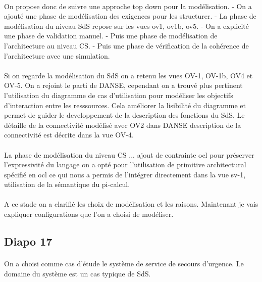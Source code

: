 \paragraph{} 
On propose donc de suivre une approche top down pour la modélisation.
- On a ajouté une phase de modélisation des exigences pour les
structurer. 
- La phase de modélisation du niveau SdS repose sur les vues ov1, ov1b,
ov5.
- On a explicité une phase de validation manuel. 
- Puis une phase de modélisation de l'architecture au niveau CS.
- Puis une phase de vérification de la cohérence de l'architecture
avec une simulation. 

\paragraph{}
Si on regarde la modélisation du SdS on a retenu les vues OV-1, OV-1b,
OV4 et OV-5. 
%
On a rejoint le parti de DANSE, cependant on a trouvé plus
pertinent l'utilisation du diagramme de cas d'utilisation pour
modéliser les objectifs d'interaction entre les resssources. Cela
améliorer la lisibilité du diagramme et permet de guider le
developpement de la description des fonctions du SdS. Le détaille de
la connectivité modélisé avec OV2 dans DANSE description de la 
connectivité est décrite dans la vue OV-4.

\paragraph{} 
La phase de modélisation du niveau CS ...
ajout de contrainte ocl pour préserver l'expressivité du langage on a
opté pour l'utilisation de primitive architectural spécifié en ocl ce
qui nous a permis de l'intégrer directement dans la vue sv-1, utilisation de la sémantique du pi-calcul.

\paragraph{} 
A ce stade on a clarifié les choix de modélisation et les raisons.
Maintenant je vais expliquer configurations que l'on a choisi de
modéliser. 
\subsection{Diapo 17}
 
\paragraph{} 
On a choisi comme cas d'étude le système de service de secours
d'urgence. Le domaine du système est un cas typique de SdS. 

